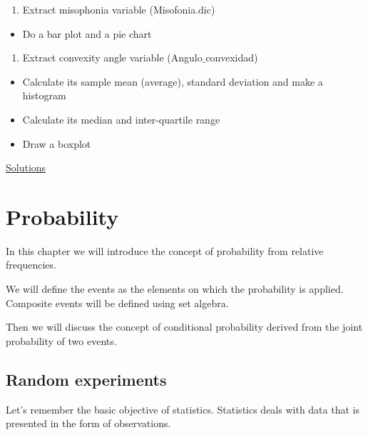 \documentclass[
]{book}
\providecommand{\tightlist}{%
  \setlength{\itemsep}{0pt}\setlength{\parskip}{0pt}}
\begin{document}
\begin{enumerate}
\def\labelenumi{\arabic{enumi}.}
\tightlist
\item
  Extract misophonia variable (Misofonia.dic)
\end{enumerate}

\begin{itemize}
\tightlist
\item
  Do a bar plot and a pie chart
\end{itemize}

\begin{enumerate}
\def\labelenumi{\arabic{enumi}.}
\setcounter{enumi}{1}
\tightlist
\item
  Extract convexity angle variable (Angulo\(\_\)convexidad)
\end{enumerate}

\begin{itemize}
\tightlist
\item
  Calculate its sample mean (average), standard deviation and make a histogram
\item
  Calculate its median and inter-quartile range
\item
  Draw a boxplot
\end{itemize}

\href{https://colab.research.google.com/drive/1ncTaoBgskCJcBIb0-PdnbUFr_AKU0XRF?usp=sharing}{Solutions}

\hypertarget{probability}{%
\chapter{Probability}\label{probability}}

In this chapter we will introduce the concept of probability from relative frequencies.

We will define the events as the elements on which the probability is applied. Composite events will be defined using set algebra.

Then we will discuss the concept of conditional probability derived from the joint probability of two events.

\hypertarget{random-experiments-1}{%
\section{Random experiments}\label{random-experiments-1}}

Let's remember the basic objective of statistics. Statistics deals with data that is presented in the form of observations.
\end{document}
